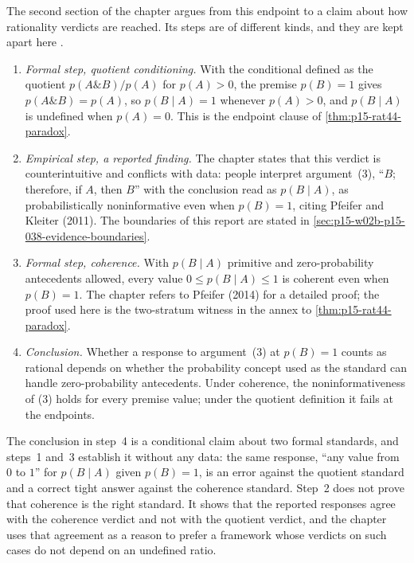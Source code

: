 The second section of the chapter argues from this endpoint to a claim
about how rationality verdicts are reached. Its steps are of different
kinds, and they are kept apart here
\cite[pp.~278--279]{Pfeifer2021ProbabilityLogic}.
\begin{enumerate}
\item \emph{Formal step, quotient conditioning.} With the conditional
      defined as the quotient \(p(A\mathbin{\&}B)/p(A)\) for
      \(p(A)>0\), the premise \(p(B)=1\) gives
      \(p(A\mathbin{\&}B)=p(A)\), so \(p(B\mid A)=1\) whenever
      \(p(A)>0\), and \(p(B\mid A)\) is undefined when \(p(A)=0\).
      This is the endpoint clause of
      \cref{thm:p15-rat44-paradox}.
\item \emph{Empirical step, a reported finding.} The chapter states
      that this verdict is counterintuitive and conflicts with data:
      people interpret argument~(3), ``\(B\); therefore, if \(A\), then
      \(B\)'' with the conclusion read as \(p(B\mid A)\), as
      probabilistically noninformative even when \(p(B)=1\), citing
      Pfeifer and Kleiter (2011). The boundaries of this report are
      stated in \cref{sec:p15-w02b-p15-038-evidence-boundaries}.
\item \emph{Formal step, coherence.} With \(p(B\mid A)\) primitive and
      zero-probability antecedents allowed, every value
      \(0\leq p(B\mid A)\leq1\) is coherent even when \(p(B)=1\).
      The chapter refers to Pfeifer (2014) for a detailed proof; the
      proof used here is the two-stratum witness in the annex to
      \cref{thm:p15-rat44-paradox}.
\item \emph{Conclusion.} Whether a response to argument~(3) at
      \(p(B)=1\) counts as rational depends on whether the probability
      concept used as the standard can handle zero-probability
      antecedents. Under coherence, the noninformativeness of (3) holds
      for every premise value; under the quotient definition it fails at
      the endpoints.
\end{enumerate}

The conclusion in step~4 is a conditional claim about two formal
standards, and steps~1 and~3 establish it without any data: the same
response, ``any value from \(0\) to \(1\)'' for \(p(B\mid A)\) given
\(p(B)=1\), is an error against the quotient standard and a correct
tight answer against the coherence standard. Step~2 does not prove that
coherence is the right standard. It shows that the reported responses
agree with the coherence verdict and not with the quotient verdict, and
the chapter uses that agreement as a reason to prefer a framework whose
verdicts on such cases do not depend on an undefined ratio.

